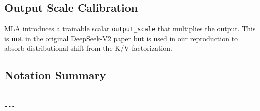 \subsection{Output Scale Calibration}

MLA introduces a trainable scalar \texttt{output\_scale} that multiplies the 
output. This is \textbf{not} in the original DeepSeek-V2 paper but is used in 
our reproduction to absorb distributional shift from the K/V factorization.

\subsection{Notation Summary}

\begin{lstlisting}

---
\end{lstlisting}